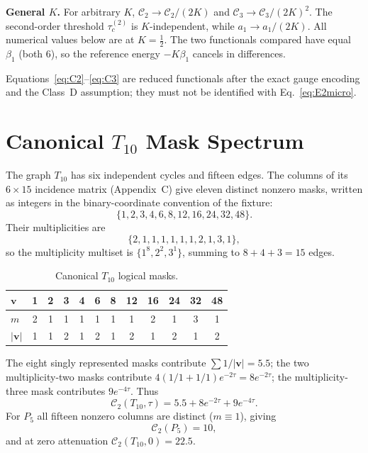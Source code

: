 \documentclass[10pt,twocolumn]{article}
\theoremstyle{definition}
\newcommand{\Tten}{T_{10}}
\newcommand{\Pfive}{P_5}
\newcommand{\tauc}{\tau_c^{(2)}}
\begin{document}
\textbf{General $K$.} For arbitrary $K$, $\mathcal C_2\to\mathcal C_2/(2K)$ and $\mathcal C_3\to\mathcal C_3/(2K)^2$. The second-order threshold $\tauc$ is $K$-independent, while $a_1\to a_1/(2K)$. All numerical values below are at $K=\tfrac12$. The two functionals compared have equal $\beta_1$ (both $6$), so the reference energy $-K\beta_1$ cancels in differences.

Equations~\eqref{eq:C2}--\eqref{eq:C3} are reduced functionals after the exact gauge encoding and the Class~D assumption; they must not be identified with Eq.~\eqref{eq:E2micro}.

\section{Canonical $\Tten$ Mask Spectrum}
The graph $\Tten$ has six independent cycles and fifteen edges. The columns of its $6\times15$ incidence matrix (Appendix~C) give eleven distinct nonzero masks, written as integers in the binary-coordinate convention of the fixture:
\begin{equation}
\{1,2,3,4,6,8,12,16,24,32,48\}. \label{eq:masks}
\end{equation}
Their multiplicities are
\begin{equation}
\{2,1,1,1,1,1,1,2,1,3,1\}, \label{eq:mult}
\end{equation}
so the multiplicity multiset is $\{1^8,2^2,3^1\}$, summing to $8+4+3=15$ edges.
\begin{table}[h]
\centering\footnotesize
\caption{Canonical $\Tten$ logical masks.}
\setlength{\tabcolsep}{3pt}
\begin{tabular}{@{}lccccccccccc@{}}
\toprule
$\mathbf v$&1&2&3&4&6&8&12&16&24&32&48\\\midrule
$m$&2&1&1&1&1&1&1&2&1&3&1\\
$|\mathbf v|$&1&1&2&1&2&1&2&1&2&1&2\\\bottomrule
\end{tabular}
\end{table}
The eight singly represented masks contribute $\sum 1/|\mathbf v|=5.5$; the two multiplicity-two masks contribute $4(1/1+1/1)e^{-2\tau}=8e^{-2\tau}$; the multiplicity-three mask contributes $9e^{-4\tau}$. Thus
\begin{equation}
\mathcal C_2(\Tten,\tau)=5.5+8e^{-2\tau}+9e^{-4\tau}. \label{eq:C2T}
\end{equation}
For $\Pfive$ all fifteen nonzero columns are distinct ($m\equiv1$), giving
\begin{equation}
\mathcal C_2(\Pfive)=10, \label{eq:C2P}
\end{equation}
and at zero attenuation $\mathcal C_2(\Tten,0)=22.5$.
\end{document}
